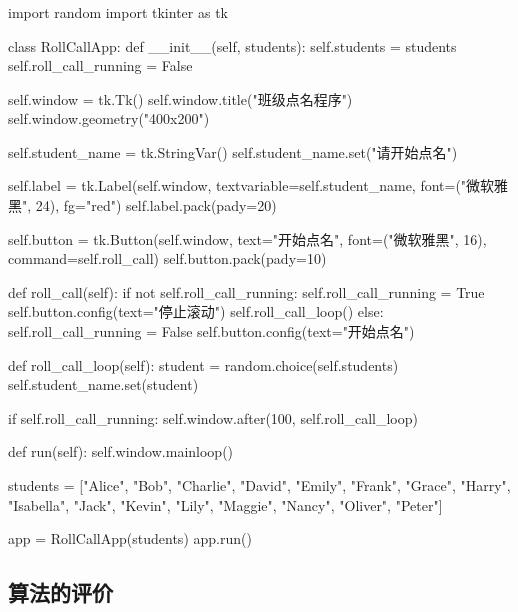 \begin{frame}[fragile]  
  \frametitle{}  
\begin{codeblock}[firstline=31, lastline =50, firstnumber=31]{}
  import random
  import tkinter as tk
  
  
  class RollCallApp:
      def __init__(self, students):
          self.students = students
          self.roll_call_running = False
  
          self.window = tk.Tk()
          self.window.title("班级点名程序")
          self.window.geometry("400x200")
  
          self.student_name = tk.StringVar()
          self.student_name.set("请开始点名")
  
          self.label = tk.Label(self.window, textvariable=self.student_name, font=("微软雅黑", 24), fg="red")
          self.label.pack(pady=20)
  
          self.button = tk.Button(self.window, text="开始点名", font=("微软雅黑", 16),  command=self.roll_call)
          self.button.pack(pady=10)
  
      def roll_call(self):
          if not self.roll_call_running:
              self.roll_call_running = True
              self.button.config(text="停止滚动")
              self.roll_call_loop()
          else:
              self.roll_call_running = False
              self.button.config(text="开始点名")
  
      def roll_call_loop(self):
          student = random.choice(self.students)
          self.student_name.set(student)
  
          if self.roll_call_running:
              self.window.after(100, self.roll_call_loop)
  
      def run(self):
          self.window.mainloop()
  
  
  students = ["Alice", "Bob", "Charlie", "David", "Emily", "Frank", "Grace", "Harry", "Isabella", "Jack", "Kevin", "Lily", "Maggie", "Nancy", "Oliver", "Peter"]
  
  app = RollCallApp(students)
  app.run()

\end{codeblock}
\end{frame}




\subsection{算法的评价}

